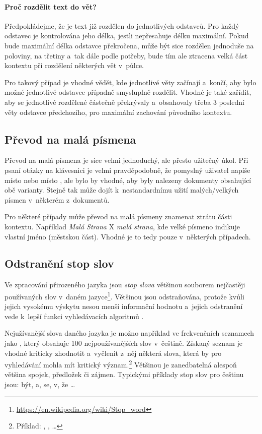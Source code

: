 \paragraph{Proč rozdělit text do vět?}
Předpokládejme, že je text již rozdělen do jednotlivých odstavců. Pro každý odstavec je kontrolována jeho délka, jestli nepřesahuje délku maximální. Pokud bude maximální délka odstavce překročena, může být sice rozdělen jednoduše na poloviny, na třetiny a~tak dále podle potřeby, bude tím ale ztracena velká část kontextu při rozdělení některých vět v~půlce.\par
Pro takový případ je vhodné vědět, kde jednotlivé věty začínají a~končí, aby bylo možné jednotlivé odstavce případně smysluplně rozdělit. Vhodné je také zařídit, aby se jednotlivé rozdělené  částečně překrývaly a~obsahovaly třeba 3 poslední věty odstavce předchozího, pro maximální zachování původního kontextu.

\subsection{Převod na malá písmena}
\label{prevod_na_mala}
Převod na malá písmena je sice velmi jednoduchý, ale přesto užitečný úkol. Při psaní otázky na klávesnici je velmi pravděpodobně, že pomyslný uživatel napíše  místo  nebo  místo , ale bylo by vhodné, aby byly nalezeny dokumenty obsahující obě varianty. Stejně tak může dojít k~nestandardnímu užití malých/velkých písmen v~některém z~dokumentů.\par
Pro některé případy může převod na malá písmeny znamenat ztrátu části kontextu. Například \emph{Malá Strana} X \emph{malá strana}, kde velké písmeno indikuje vlastní jméno (městskou část). Vhodné je to tedy pouze v~některých případech.

\subsection{Odstranění stop slov}
\label{stopwords}
Ve zpracování přirozeného jazyka jsou \emph{stop slova} většinou souborem nejčastěji používaných slov v~daném jazyce\footnote{\url{https://en.wikipedia.org/wiki/Stop_word}}. Většinou jsou odstraňována, protože kvůli jejich vysokému výskytu nesou menší informační hodnotu a~jejich odstranění vede k~lepší funkci vyhledávacích algoritmů \cite{bm25_improvements}.\par
Nejužívanější slova daného jazyka je možno například ve frekvenčních seznamech jako \cite{wiki:frekvencni_seznam}, který obsahuje 100 nejpoužívanějších slov v~češtině. Získaný seznam je vhodné kriticky zhodnotit a~vyčlenit z~něj některá slova, která by pro vyhledávání mohla mít kritický význam.\footnote{Příklad: , ,  \dots} Většinou je zanedbatelná alespoň většina spojek, předložek či zájmen. Typickými příklady stop slov pro češtinu jsou: být, a, se, v, že \dots

